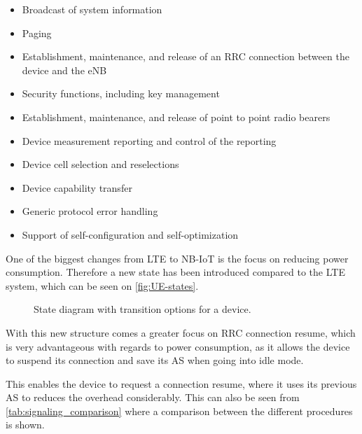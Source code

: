 \begin{itemize}
    \item Broadcast of system information
    \item Paging
    \item Establishment, maintenance, and release of an \gls{RRC} connection between the device and the \gls{eNB}
    \item Security functions, including key management
    \item Establishment, maintenance, and release of point to point radio bearers
    \item Device measurement reporting and control of the reporting
    \item Device cell selection and reselections 
    \item Device capability transfer
    \item Generic protocol error handling
    \item Support of self-configuration and self-optimization
\end{itemize}

One of the biggest changes from \gls{LTE} to \gls{NB-IoT} is the focus on reducing power consumption. Therefore a new state has been introduced compared to the \gls{LTE} system, which can be seen on \autoref{fig:UE-states}.

\begin{figure}[H]
\centering

\caption{State diagram with transition options for a device.}
\label{fig:UE-states}
\end{figure}


With this new structure comes a greater focus on \gls{RRC} connection resume, which is very advantageous with regards to power consumption, as it allows the device to suspend its connection and save its \gls{AS} when going into idle mode.

This enables the device to request a connection resume, where it uses its previous \gls{AS} to reduces the overhead considerably. This can also be seen from \autoref{tab:signaling_comparison} where a comparison between the different procedures is shown. 

